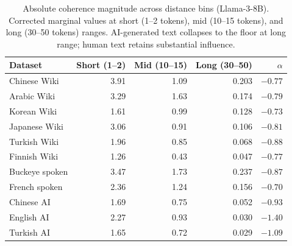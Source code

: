 \documentclass[9pt,twoside,lineno]{pnas-new}
\begin{document}
\begin{table}[h]
\centering
\caption{Absolute coherence magnitude across distance bins (Llama-3-8B). Corrected marginal values at short (1--2 tokens), mid (10--15 tokens), and long (30--50 tokens) ranges. AI-generated text collapses to the floor at long range; human text retains substantial influence.}
\label{tab:absolute-magnitude}
\begin{tabular}{lrrrr}
\toprule
Dataset & Short (1--2) & Mid (10--15) & Long (30--50) & $\alpha$ \\
\midrule
Chinese Wiki     & 3.91 & 1.09 & 0.203 & $-0.77$ \\
Arabic Wiki      & 3.29 & 1.63 & 0.174 & $-0.79$ \\
Korean Wiki      & 1.61 & 0.99 & 0.128 & $-0.73$ \\
Japanese Wiki    & 3.06 & 0.91 & 0.106 & $-0.81$ \\
Turkish Wiki     & 1.96 & 0.85 & 0.068 & $-0.88$ \\
Finnish Wiki     & 1.26 & 0.43 & 0.047 & $-0.77$ \\
Buckeye spoken   & 3.47 & 1.73 & 0.237 & $-0.87$ \\
French spoken    & 2.36 & 1.24 & 0.156 & $-0.70$ \\
\midrule
Chinese AI       & 1.69 & 0.75 & 0.052 & $-0.93$ \\
English AI       & 2.27 & 0.93 & 0.030 & $-1.40$ \\
Turkish AI       & 1.65 & 0.72 & 0.029 & $-1.09$ \\
\bottomrule
\end{tabular}
\end{table}
\end{document}
